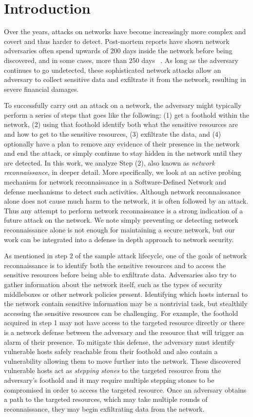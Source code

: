 \section{Introduction}
Over the years, attacks on networks have become increasingly more
complex and covert and thus harder to detect. Post-mortem reports have 
shown network adversaries often spend upwards of 200 days inside the 
network before being discovered, and in some cases, more than 250 days
~\cite{attackers}. As long as the adversary continues to go undetected, 
these sophisticated network attacks allow an adversary to collect 
sensitive data and exfiltrate it from the network, resulting in severe 
financial damages.

To successfully carry out an attack on a network, the adversary might
typically perform a series of steps that goes like the following:
(1) get a foothold within the network, (2) using that foothold
identify both what the sensitive resources are and how to get to the
sensitive resources, (3) exfiltrate the data, and (4)
optionally have a plan to remove any evidence of their presence in the
network and end the attack, or simply continue to stay hidden in the 
network until they are detected. In this work, we analyze Step (2), also
known as \textit{network reconnaissance}, in deeper detail. More 
specifically, we look at an active probing mechanism for network
reconnaissance in a Software-Defined Network and defense mechanisms to 
detect such activities. Although network reconnaissance alone does not 
cause much harm to the network, it is often followed by an attack. Thus 
any attempt to perform network reconnaissance is a strong indication of 
a future attack on the network. We note simply preventing or detecting 
network reconnaissance alone is not enough for maintaining a secure
network, but our work can be integrated into a defense in depth 
approach to network security.

As mentioned in step 2 of the sample attack lifecycle, one of the goals 
of network reconnaissance is to identify both the sensitive resources 
and to access the sensitive resources before being able to exfiltrate 
data. Adversaries also try to gather information about the network 
itself, such as the types of security middleboxes or other network 
policies present. Identifying which hosts internal to the network contain
sensitive information may be a nontrivial task, but stealthily 
accessing the sensitive resources can be challenging. For example, the
foothold acquired in step 1  may not have access to the targeted 
resource directly or there is a network defense between the adversary
and the resource that will trigger an alarm of their presence. To
mitigate this defense, the adversary must identify vulnerable hosts 
safely reachable from their foothold and also contain a vulnerability
allowing them to move further into the network. These discovered 
vulnerable hosts act as \textit{stepping stones} to the targeted 
resource from the adversary's foothold and it may require multiple 
stepping stones to be compromised in order to access the targeted
resource. Once an adversary obtains a path to the targeted resources,
which may take multiple rounds of reconnaissance, they may begin
exfiltrating data from the network.
 
